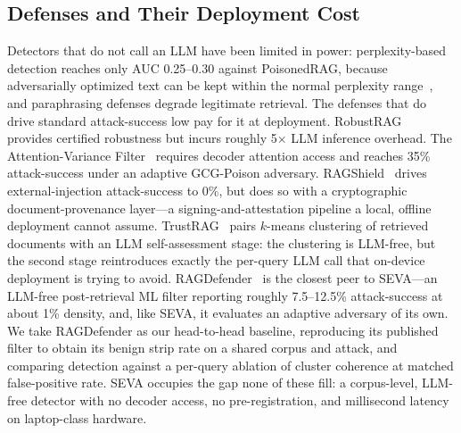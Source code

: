 \documentclass[10pt,journal,compsoc]{IEEEtran}
\begin{document}
\subsection{Defenses and Their Deployment Cost}
Detectors that do not call an LLM have been limited in power: perplexity-based
detection reaches only AUC 0.25--0.30 against PoisonedRAG, because adversarially
optimized text can be kept within the normal perplexity
range~\cite{poisonedrag}, and paraphrasing defenses degrade legitimate
retrieval. The defenses that do drive standard attack-success low pay for it at
deployment. RobustRAG~\cite{robustrag} provides certified robustness but incurs
roughly 5$\times$ LLM inference overhead. The Attention-Variance
Filter~\cite{avfilter} requires decoder attention access and reaches 35\%
attack-success under an adaptive GCG-Poison adversary. RAGShield~\cite{ragshield}
drives external-injection attack-success to 0\%, but does so with a cryptographic
document-provenance layer---a signing-and-attestation pipeline a local, offline deployment
cannot assume.
TrustRAG~\cite{trustrag} pairs $k$-means clustering of retrieved documents with an
LLM self-assessment stage: the clustering is LLM-free, but the second stage
reintroduces exactly the per-query LLM call that on-device deployment is trying to
avoid. RAGDefender~\cite{ragdefender} is the closest peer to SEVA---an LLM-free
post-retrieval ML filter reporting roughly 7.5--12.5\% attack-success at about
1\% density, and, like SEVA, it evaluates an adaptive adversary of its own. We
take RAGDefender as our head-to-head baseline, reproducing its published filter to
obtain its benign strip rate on a shared corpus and attack, and comparing detection against a
per-query ablation of cluster coherence at matched false-positive rate.
SEVA occupies the gap none of these fill: a corpus-level, LLM-free detector with
no decoder access, no pre-registration, and millisecond latency on laptop-class
hardware.
\end{document}

